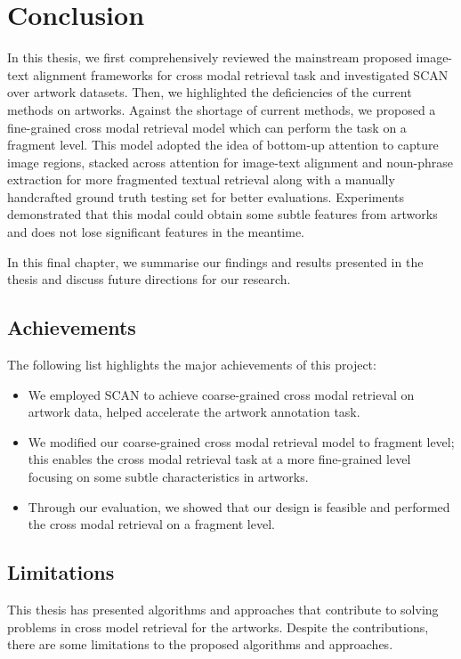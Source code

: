 \chapter{Conclusion}
\label{cha:conclusion}

In this thesis, we first comprehensively reviewed the mainstream proposed image-text alignment frameworks for cross modal retrieval task and investigated SCAN over artwork datasets. Then, we highlighted the deficiencies of the current methods on artworks. Against the shortage of current methods, we proposed a fine-grained cross modal retrieval model which can perform the task on a fragment level. This model adopted the idea of bottom-up attention \cite{bottomup} to capture image regions, stacked across attention \cite{scan} for image-text alignment and noun-phrase extraction for more fragmented textual retrieval along with a manually handcrafted ground truth testing set for better evaluations. Experiments demonstrated that this modal could obtain some subtle features from artworks and does not lose significant features in the meantime. 

In this final chapter, we summarise our findings and results presented in the thesis and discuss future directions for our research.

\section{Achievements}
The following list highlights the major achievements of this project:

\begin{itemize}
    \item We employed SCAN to achieve coarse-grained cross modal retrieval on artwork data, helped accelerate the artwork annotation task.
    \item We modified our coarse-grained cross modal retrieval model to fragment level; this enables the cross modal retrieval task at a more fine-grained level focusing on some subtle characteristics in artworks.
    \item Through our evaluation, we showed that our design is feasible and performed the cross modal retrieval on a fragment level.
\end{itemize}


\section{Limitations}
This thesis has presented algorithms and approaches that contribute to solving problems in cross model retrieval for the artworks. Despite the contributions, there are some limitations to the proposed algorithms and approaches.

